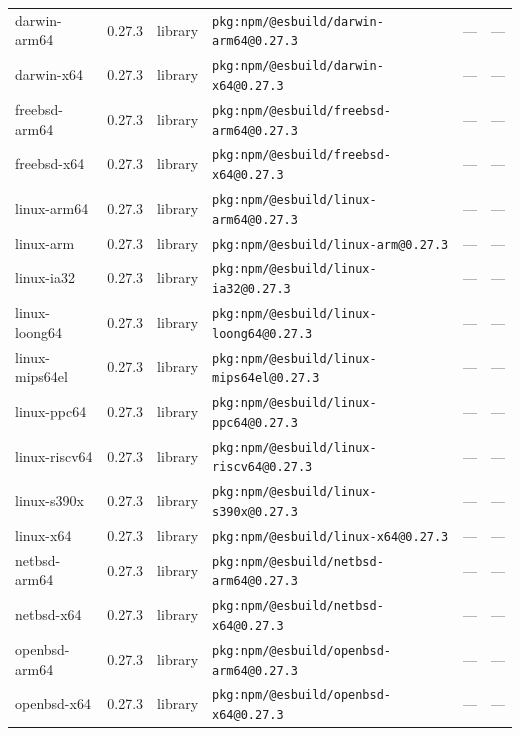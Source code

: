 \documentclass[11pt,a4paper]{article}
\begin{document}
\begin{longtable}{|p{4cm}|p{2cm}|p{1.6cm}|p{5cm}|p{1.5cm}|p{3.5cm}|}
\raggedright darwin-arm64 & 0.27.3 & library & \small\texttt{pkg:npm/@esbuild/darwin-arm64@0.27.3} & — & \small — \\
\raggedright darwin-x64 & 0.27.3 & library & \small\texttt{pkg:npm/@esbuild/darwin-x64@0.27.3} & — & \small — \\
\raggedright freebsd-arm64 & 0.27.3 & library & \small\texttt{pkg:npm/@esbuild/freebsd-arm64@0.27.3} & — & \small — \\
\raggedright freebsd-x64 & 0.27.3 & library & \small\texttt{pkg:npm/@esbuild/freebsd-x64@0.27.3} & — & \small — \\
\raggedright linux-arm64 & 0.27.3 & library & \small\texttt{pkg:npm/@esbuild/linux-arm64@0.27.3} & — & \small — \\
\raggedright linux-arm & 0.27.3 & library & \small\texttt{pkg:npm/@esbuild/linux-arm@0.27.3} & — & \small — \\
\raggedright linux-ia32 & 0.27.3 & library & \small\texttt{pkg:npm/@esbuild/linux-ia32@0.27.3} & — & \small — \\
\raggedright linux-loong64 & 0.27.3 & library & \small\texttt{pkg:npm/@esbuild/linux-loong64@0.27.3} & — & \small — \\
\raggedright linux-mips64el & 0.27.3 & library & \small\texttt{pkg:npm/@esbuild/linux-mips64el@0.27.3} & — & \small — \\
\raggedright linux-ppc64 & 0.27.3 & library & \small\texttt{pkg:npm/@esbuild/linux-ppc64@0.27.3} & — & \small — \\
\raggedright linux-riscv64 & 0.27.3 & library & \small\texttt{pkg:npm/@esbuild/linux-riscv64@0.27.3} & — & \small — \\
\raggedright linux-s390x & 0.27.3 & library & \small\texttt{pkg:npm/@esbuild/linux-s390x@0.27.3} & — & \small — \\
\raggedright linux-x64 & 0.27.3 & library & \small\texttt{pkg:npm/@esbuild/linux-x64@0.27.3} & — & \small — \\
\raggedright netbsd-arm64 & 0.27.3 & library & \small\texttt{pkg:npm/@esbuild/netbsd-arm64@0.27.3} & — & \small — \\
\raggedright netbsd-x64 & 0.27.3 & library & \small\texttt{pkg:npm/@esbuild/netbsd-x64@0.27.3} & — & \small — \\
\raggedright openbsd-arm64 & 0.27.3 & library & \small\texttt{pkg:npm/@esbuild/openbsd-arm64@0.27.3} & — & \small — \\
\raggedright openbsd-x64 & 0.27.3 & library & \small\texttt{pkg:npm/@esbuild/openbsd-x64@0.27.3} & — & \small — \\

\end{longtable}
\end{document}
